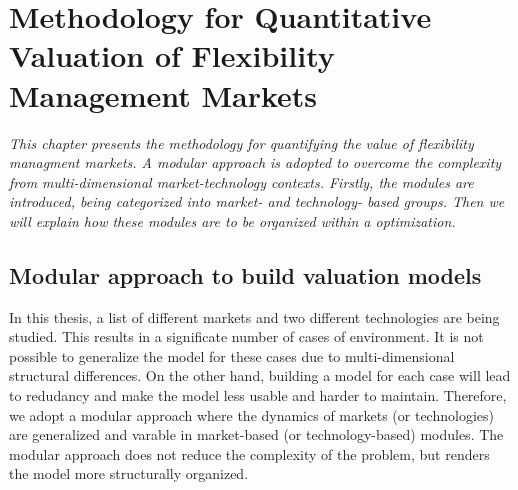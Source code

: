 \chapter{Methodology for Quantitative Valuation of Flexibility Management Markets}
\label{ch:methodology}
\textit{This chapter presents the methodology for quantifying the value of flexibility managment markets. A modular approach is adopted to overcome the complexity from multi-dimensional market-technology contexts. Firstly, the modules are introduced, being categorized into market- and technology- based groups. Then we will explain how these modules are to be organized within a optimization.}

\section{Modular approach to build valuation models}
In this thesis, a list of different markets and two different technologies are being studied. This results in a significate number of cases of environment. It is not possible to generalize the model for these cases due to multi-dimensional structural differences. On the other hand, building a model for each case will lead to redudancy and make the model less usable and harder to maintain. Therefore, we adopt a modular approach where the dynamics of markets (or technologies) are generalized and varable in market-based (or technology-based) modules. The modular approach does not reduce the complexity of the problem, but renders the model more structurally organized.

